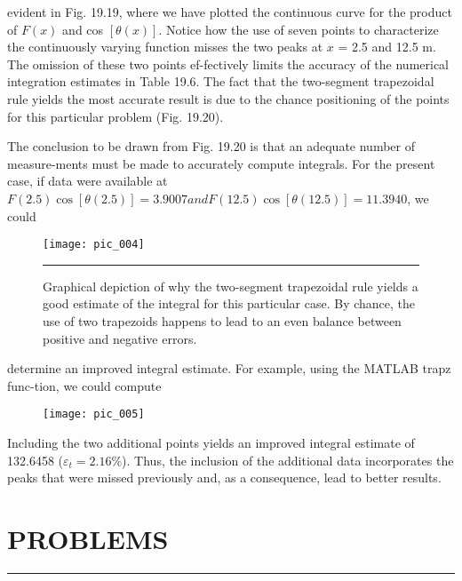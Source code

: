 \documentclass[../main.tex]{subfiles}
\begin{document}
\vspace{0.2in}

evident in Fig. 19.19, where we have plotted the continuous curve for the product of $F(x)$
and cos $[\theta(x)]$. Notice how the use of seven points to characterize the continuously varying
function misses the two peaks at $x$ = 2.5 and 12.5 m. The omission of these two points ef-fectively limits the accuracy of the numerical integration estimates in Table 19.6. The fact
that the two-segment trapezoidal rule yields the most accurate result is due to the chance
positioning of the points for this particular problem (Fig. 19.20).

The conclusion to be drawn from Fig. 19.20 is that an adequate number of measure-ments must be made to accurately compute integrals. For the present case, if data were
available at $F(2.5) \cos [\theta(2.5)] = 3.9007 and F(12.5) \cos [\theta(12.5)] = 11.3940$, we could

\pagebreak

\begin{figure}[hbt!]
	\centering
	\texttt{[image: pic\_004]}
	\caption{\textsf{Graphical depiction of why the two-segment trapezoidal rule yields a good estimate of the
integral for this particular case. By chance, the use of two trapezoids happens to lead to an
even balance between positive and negative errors.}} 

\hrule
	\label{pic.004}
\end{figure}

\vspace{0.2in}

determine an improved integral estimate. For example, using the MATLAB trapz func-tion, we could compute

\begin{figure}[hbt!]
	\centering
	\texttt{[image: pic\_005]}
	\label{pic.005}
\end{figure}

Including the two additional points yields an improved integral estimate of 132.6458 ($\varepsilon_t = 2.16\%$). Thus, the inclusion of the additional data incorporates the peaks that were
missed previously and, as a consequence, lead to better results.

\vspace{0.3in}

\section*{PROBLEMS} \hrule
\end{document}
